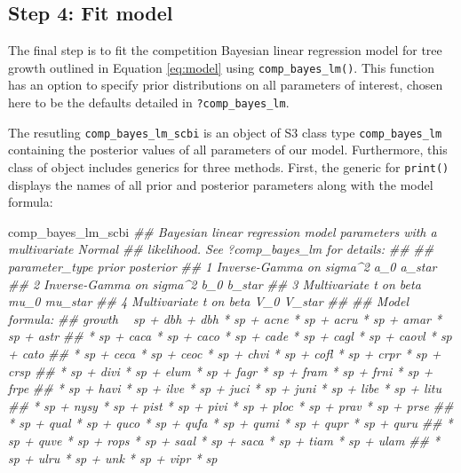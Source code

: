 \documentclass[12pt]{article}
\newenvironment{Shaded}{\begin{snugshade}}{\end{snugshade}}
\newcommand{\CommentTok}[1]{\textcolor[rgb]{0.56,0.35,0.01}{\textit{#1}}}
\newcommand{\DataTypeTok}[1]{\textcolor[rgb]{0.13,0.29,0.53}{#1}}
\newcommand{\KeywordTok}[1]{\textcolor[rgb]{0.13,0.29,0.53}{\textbf{#1}}}
\newcommand{\NormalTok}[1]{#1}
\newcommand{\OperatorTok}[1]{\textcolor[rgb]{0.81,0.36,0.00}{\textbf{#1}}}
\newcommand{\OtherTok}[1]{\textcolor[rgb]{0.56,0.35,0.01}{#1}}
\newcommand{\StringTok}[1]{\textcolor[rgb]{0.31,0.60,0.02}{#1}}
\begin{document}
\hypertarget{model-fit-predict}{%
\subsection{Step 4: Fit model}\label{model-fit-predict}}

The final step is to fit the competition Bayesian linear regression
model for tree growth outlined in Equation \ref{eq:model} using
\texttt{comp\_bayes\_lm()}. This function has an option to specify prior
distributions on all parameters of interest, chosen here to be the
defaults detailed in \texttt{?comp\_bayes\_lm}.

\begin{Shaded}
\end{Shaded}

The resutling \texttt{comp\_bayes\_lm\_scbi} is an object of S3 class
type \texttt{comp\_bayes\_lm} containing the posterior values of all
parameters of our model. Furthermore, this class of object includes
generics for three methods. First, the generic for \texttt{print()}
displays the names of all prior and posterior parameters along with the
model formula:

\begin{Shaded}
\begin{Highlighting}[]
\NormalTok{comp_bayes_lm_scbi}
\CommentTok{## Bayesian linear regression model parameters with a multivariate Normal}
\CommentTok{## likelihood. See ?comp_bayes_lm for details:}
\CommentTok{## }
\CommentTok{##   parameter_type           prior posterior}
\CommentTok{## 1 Inverse-Gamma on sigma^2 a_0   a_star   }
\CommentTok{## 2 Inverse-Gamma on sigma^2 b_0   b_star   }
\CommentTok{## 3 Multivariate t on beta   mu_0  mu_star  }
\CommentTok{## 4 Multivariate t on beta   V_0   V_star   }
\CommentTok{## }
\CommentTok{## Model formula:}
\CommentTok{## growth ~ sp + dbh + dbh * sp + acne * sp + acru * sp + amar * sp + astr}
\CommentTok{## * sp + caca * sp + caco * sp + cade * sp + cagl * sp + caovl * sp + cato}
\CommentTok{## * sp + ceca * sp + ceoc * sp + chvi * sp + cofl * sp + crpr * sp + crsp}
\CommentTok{## * sp + divi * sp + elum * sp + fagr * sp + fram * sp + frni * sp + frpe}
\CommentTok{## * sp + havi * sp + ilve * sp + juci * sp + juni * sp + libe * sp + litu}
\CommentTok{## * sp + nysy * sp + pist * sp + pivi * sp + ploc * sp + prav * sp + prse}
\CommentTok{## * sp + qual * sp + quco * sp + qufa * sp + qumi * sp + qupr * sp + quru}
\CommentTok{## * sp + quve * sp + rops * sp + saal * sp + saca * sp + tiam * sp + ulam}
\CommentTok{## * sp + ulru * sp + unk * sp + vipr * sp}
\end{Highlighting}
\end{Shaded}
\end{document}
